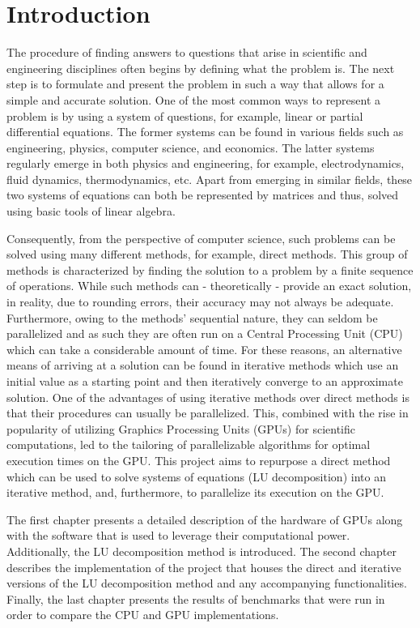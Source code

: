\chapter*{Introduction}		 		 		 %

The procedure of finding answers to questions that arise in scientific and engineering disciplines often begins by defining what the problem is. The next step is to formulate and present the problem in such a way that allows for a simple and accurate solution. One of the most common ways to represent a problem is by using a system of questions, for example, linear or partial differential equations. The former systems can be found in various fields such as engineering, physics, computer science, and economics. The latter systems regularly emerge in both physics and engineering, for example, electrodynamics, fluid dynamics, thermodynamics, etc. Apart from emerging in similar fields, these two systems of equations can both be represented by matrices and thus, solved using basic tools of linear algebra.
\par Consequently, from the perspective of computer science, such problems can be solved using many different methods, for example, direct methods. This group of methods is characterized by finding the solution to a problem by a finite sequence of operations. While such methods can - theoretically - provide an exact solution, in reality, due to rounding errors, their accuracy may not always be adequate. Furthermore, owing to the methods' sequential nature, they can seldom be parallelized and as such they are often run on a Central Processing Unit (CPU) which can take a considerable amount of time. For these reasons, an alternative means of arriving at a solution can be found in iterative methods which use an initial value as a starting point and then iteratively converge to an approximate solution. One of the advantages of using iterative methods over direct methods is that their procedures can usually be parallelized. This, combined with the rise in popularity of utilizing Graphics Processing Units (GPUs) for scientific computations, led to the tailoring of parallelizable algorithms for optimal execution times on the GPU. This project aims to repurpose a direct method which can be used to solve systems of equations (LU decomposition) into an iterative method, and, furthermore, to parallelize its execution on the GPU.
\par The first chapter presents a detailed description of the hardware of GPUs along with the software that is used to leverage their computational power. Additionally, the LU decomposition method is introduced. The second chapter describes the implementation of the project that houses the direct and iterative versions of the LU decomposition method and any accompanying functionalities. Finally, the last chapter presents the results of benchmarks that were run in order to compare the CPU and GPU implementations.